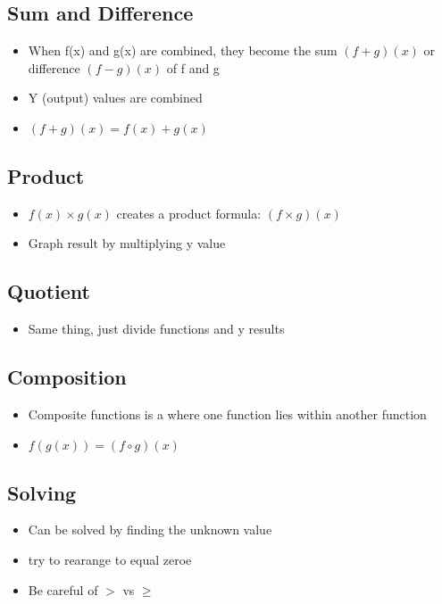 \documentclass{article}
\begin{document}
    \subsection{Sum and Difference}
    \begin{itemize}
        \item When f(x) and g(x) are combined, they become the sum $(f+g)(x)$ or difference $(f-g)(x)$ of f and g
        \item Y (output) values are combined
        \item $(f + g)(x) = f(x) + g(x)$
    \end{itemize}

    \subsection{Product}
    \begin{itemize}
        \item $f(x) \times g(x)$ creates a product formula: $(f\times g)(x)$
        \item Graph result by multiplying y value
    \end{itemize}

    \subsection{Quotient}
    \begin{itemize}
        \item Same thing, just divide functions and y results
    \end{itemize}

    \subsection{Composition}
    \begin{itemize}
        \item Composite functions is a where one function lies within another function
        \item $f(g(x)) = (f\circ g)(x)$
    \end{itemize}

    \subsection{Solving}
    \begin{itemize}
        \item Can be solved by finding the unknown value
        \item try to rearange to equal zeroe
        \item Be careful of $>$ vs $\geq$
    \end{itemize}
\end{document}
